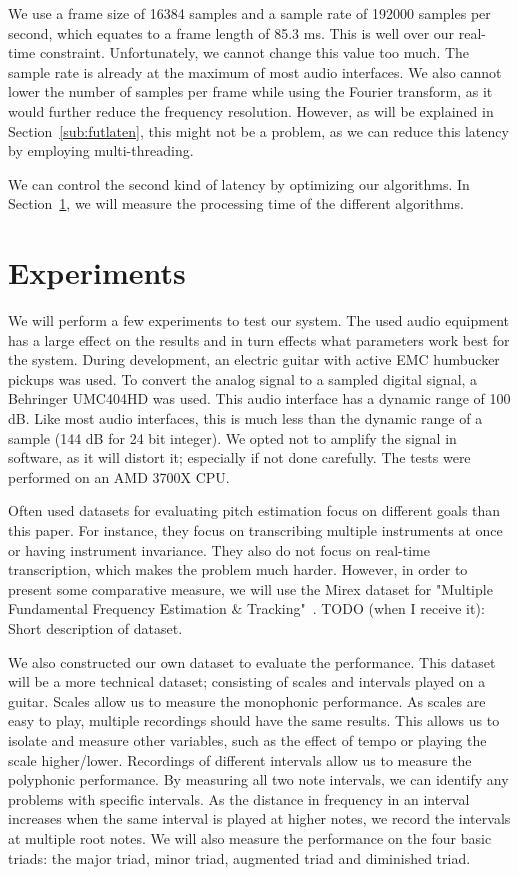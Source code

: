 \documentclass[10pt,twocolumn]{article}
\begin{document}
We use a frame size of 16384 samples and a sample rate of 192000 samples per second, which equates to a frame length of 85.3 ms. This is well over our real-time constraint. Unfortunately, we cannot change this value too much. The sample rate is already at the maximum of most audio interfaces. We also cannot lower the number of samples per frame while using the Fourier transform, as it would further reduce the frequency resolution. However, as will be explained in Section~\ref{sub:futlaten}, this might not be a problem, as we can reduce this latency by employing multi-threading.

We can control the second kind of latency by optimizing our algorithms. In Section~\ref{sec:exp}, we will measure the processing time of the different algorithms.


\section{Experiments}  \label{sec:exp}
We will perform a few experiments to test our system. The used audio equipment has a large effect on the results and in turn effects what parameters work best for the system. During development, an electric guitar with active EMC humbucker pickups was used. To convert the analog signal to a sampled digital signal, a Behringer UMC404HD was used. This audio interface has a dynamic range of 100 dB. Like most audio interfaces, this is much less than the dynamic range of a sample (144 dB for 24 bit integer). We opted not to amplify the signal in software, as it will distort it; especially if not done carefully. The tests were performed on an AMD 3700X CPU.

Often used datasets for evaluating pitch estimation focus on different goals than this paper. For instance, they focus on transcribing multiple instruments at once or having instrument invariance. They also do not focus on real-time transcription, which makes the problem much harder. However, in order to present some comparative measure, we will use the Mirex dataset for "Multiple Fundamental Frequency Estimation \& Tracking"~\cite{data}. TODO (when I receive it): Short description of dataset.

We also constructed our own dataset to evaluate the performance. This dataset will be a more technical dataset; consisting of scales and intervals played on a guitar. Scales allow us to measure the monophonic performance. As scales are easy to play, multiple recordings should have the same results. This allows us to isolate and measure other variables, such as the effect of tempo or playing the scale higher/lower. Recordings of different intervals allow us to measure the polyphonic performance. By measuring all two note intervals, we can identify any problems with specific intervals. As the distance in frequency in an interval increases when the same interval is played at higher notes, we record the intervals at multiple root notes. We will also measure the performance on the four basic triads: the major triad, minor triad, augmented triad and diminished triad.
\end{document}
